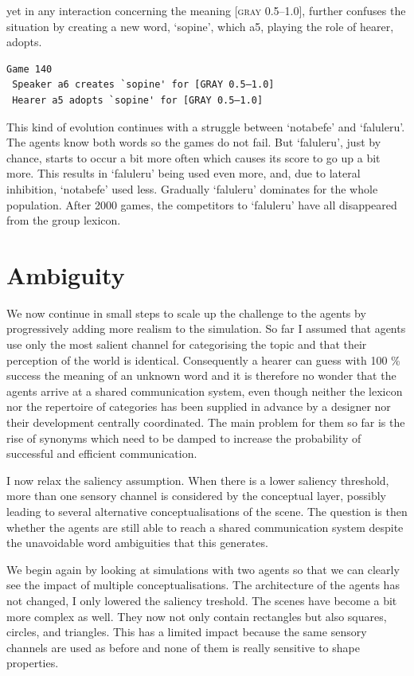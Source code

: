 yet in any interaction concerning the 
meaning [\textsc{gray} 0.5–1.0], further confuses the situation by 
creating a new word, `sopine', which {\bfshape  a5}, playing
the role of hearer, adopts. 
\begin{verbatim}
Game 140
 Speaker a6 creates `sopine' for [GRAY 0.5–1.0]
 Hearer a5 adopts `sopine' for [GRAY 0.5–1.0]
\end{verbatim}
This kind of evolution continues with a struggle between 
`notabefe' and `faluleru'. The agents know both 
words so the games do not fail. But `faluleru', 
just by chance, starts to occur a bit more often
which causes its score to go up a bit more. 
This results in `faluleru' being used even more, 
and, due to lateral inhibition, `notabefe' used 
less. Gradually `faluleru' dominates for 
the whole population. 
After 2000 games, the competitors to `faluleru' have 
all disappeared from the group lexicon. 

\section{Ambiguity} 

We now continue in small steps to scale up the
challenge to the agents by progressively 
adding more realism to the simulation. So far I 
assumed that agents use only 
the most salient channel for categorising the topic
and that their perception of the world is identical.
Consequently a hearer can guess with 100 \% success the
meaning of an unknown word and 
it is therefore no wonder that the agents arrive at a 
shared communication system, 
even though neither the lexicon nor the repertoire
of categories has been supplied in advance by a 
designer nor their development centrally
coordinated. The main problem for them so far is 
the rise of synonyms which need to be damped to 
increase the probability of successful and 
efficient communication. 

I now relax the saliency assumption. When 
there is a lower saliency threshold, more than one
sensory channel is considered by the conceptual 
layer, possibly leading to several alternative
conceptualisations of the scene. The question is 
then whether the agents are still able to reach 
a shared communication system despite the unavoidable
word ambiguities that this generates. 

We begin again by looking at simulations
with two agents so that we 
can clearly see the impact of multiple conceptualisations. 
The architecture of the agents has not changed, I only 
lowered the saliency treshold. 
The scenes have become a bit more complex as well. They 
now not only contain rectangles but also squares, circles, 
and triangles. This has a limited impact because the 
same sensory channels are used as before and none of them 
is really sensitive to shape properties. 


